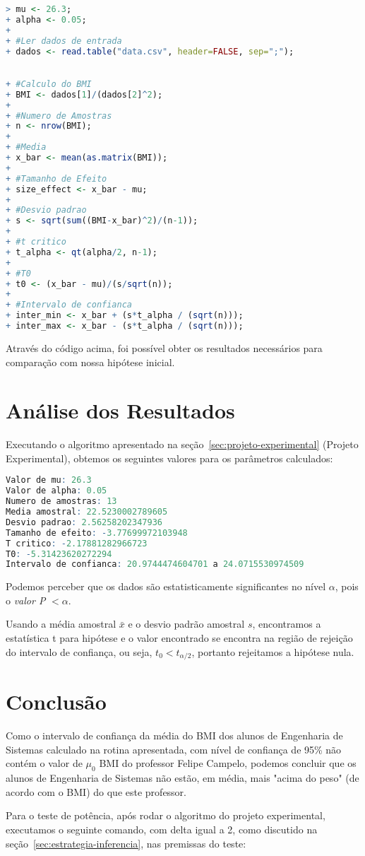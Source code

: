 \documentclass[12pt, a4paper]{article}
\begin{document}
\begin{lstlisting}[language=R]
> mu <- 26.3;
+ alpha <- 0.05;
+	
+ #Ler dados de entrada
+ dados <- read.table("data.csv", header=FALSE, sep=";");
	

+ #Calculo do BMI
+ BMI <- dados[1]/(dados[2]^2);
+	
+ #Numero de Amostras
+ n <- nrow(BMI);
+	
+ #Media
+ x_bar <- mean(as.matrix(BMI));
+	
+ #Tamanho de Efeito
+ size_effect <- x_bar - mu;
+	
+ #Desvio padrao
+ s <- sqrt(sum((BMI-x_bar)^2)/(n-1));
+	
+ #t critico
+ t_alpha <- qt(alpha/2, n-1);
+
+ #T0
+ t0 <- (x_bar - mu)/(s/sqrt(n));
+	
+ #Intervalo de confianca
+ inter_min <- x_bar + (s*t_alpha / (sqrt(n)));
+ inter_max <- x_bar - (s*t_alpha / (sqrt(n)));	
\end{lstlisting}
\par Através do código acima, foi possível obter os resultados necessários para comparação com nossa hipótese inicial.

\section{Análise dos Resultados}
Executando o algoritmo apresentado na seção~\ref{sec:projeto-experimental} (Projeto Experimental), obtemos os seguintes valores para os parâmetros calculados:

\begin{lstlisting}[language=R]
Valor de mu: 26.3
Valor de alpha: 0.05
Numero de amostras: 13
Media amostral: 22.5230002789605
Desvio padrao: 2.56258202347936
Tamanho de efeito: -3.77699972103948
T critico: -2.17881282966723
T0: -5.31423620272294
Intervalo de confianca: 20.9744474604701 a 24.0715530974509
\end{lstlisting}

\par Podemos perceber que os dados são estatisticamente significantes no nível $\alpha$, pois o \textit{valor P} $< \alpha$.
\par Usando a média amostral $\bar{x}$ e o desvio padrão amostral $s$, encontramos a estatística t para hipótese e o valor encontrado se encontra na região de rejeição do intervalo de confiança, ou seja, $t_{0} < t_{\alpha/2}$, portanto rejeitamos a hipótese nula.

\section{Conclusão}
\par Como o intervalo de confiança da média do BMI dos alunos de Engenharia de Sistemas calculado na rotina apresentada, com nível de confiança de 95\% não contém o valor de $\mu_{0}$ BMI do professor Felipe Campelo, podemos concluir que os alunos de Engenharia de Sistemas não estão, em média, mais "acima do peso" (de acordo com o BMI) do que este professor.
\par Para o teste de potência, após rodar o algoritmo do projeto experimental, executamos o seguinte comando, com delta igual a 2, como discutido na seção~\ref{sec:estrategia-inferencia}, nas premissas do teste:
\end{document}
